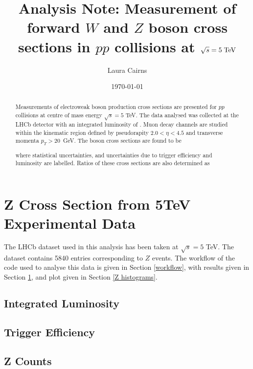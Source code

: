 \documentclass[a4paper]{article}
\title{Analysis Note: Measurement of forward $W$ and $Z$ boson cross sections in $pp$ collisions at $\sqrt{s}=5 \; \rm{TeV}$}
\author{Laura Cairns}
\date{\today}
\begin{document}
\maketitle

\begin{abstract}
    \noindent 
    Measurements of electroweak boson production cross sections are presented for $pp$ collisions at centre of mass energy $\sqrt{s} = 5$ TeV. The data analysed was collected at the LHCb detector with an integrated luminosity of . Muon decay channels are studied within the kinematic region defined by pseudorapity $2.0 < \eta < 4.5$ and transverse momenta $p_T > 20$~GeV. The boson cross sections are found to be
    
    
    
    where statistical uncertainties, and uncertainties due to trigger efficiency and luminosity are labelled. Ratios of these cross sections are also determined as 
    
    
\end{abstract}


\section{Z Cross Section from 5TeV Experimental Data} \label{results}

The LHCb dataset used in this analysis has been taken at $\sqrt{s} = 5$ TeV. The dataset contains 5840 entries corresponding to $Z$ events. The workflow of the code used to analyse this data is given in Section \ref{workflow}, with results given in Section \ref{results}, and plot given in Section \ref{Z histograms}.

\subsection{Integrated Luminosity} \label{lumi_val}


\subsection{Trigger Efficiency} \label{trigger_val}


\subsection{Z Counts} \label{counts_val}

\end{document}
